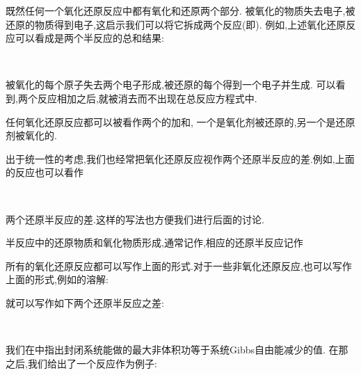 \documentclass{ctexart}
\begin{document}
既然任何一个氧化还原反应中都有氧化和还原两个部分.%
被氧化的物质失去电子,被还原的物质得到电子,这启示我们可以将它拆成两个反应(即).
例如,上述氧化还原反应可以看成是两个半反应的总和结果:
\begin{tightcenter}
    \\
\end{tightcenter}
被氧化的每个原子失去两个电子形成,被还原的每个得到一个电子并生成.%
可以看到,两个反应相加之后,就被消去而不出现在总反应方程式中.
\begin{definition}[6A.1.2 半反应]
    任何氧化还原反应都可以被看作两个的加和,%
    一个是氧化剂被还原的,另一个是还原剂被氧化的.
\end{definition}
出于统一性的考虑,我们也经常把氧化还原反应视作两个还原半反应的差.例如,上面的反应也可以看作
\begin{tightcenter}
    \\
\end{tightcenter}
两个还原半反应的差.这样的写法也方便我们进行后面的讨论.
\begin{definition}[6A.1.3 氧化还原对]
    半反应中的还原物质和氧化物质\footnotemark 形成,通常记作,相应的还原半反应记作
    \begin{tightcenter}
    \end{tightcenter}

\end{definition}
所有的氧化还原反应都可以写作上面的形式.对于一些非氧化还原反应,也可以写作上面的形式,例如的溶解:
\begin{tightcenter}
\end{tightcenter}
就可以写作如下两个还原半反应之差:
\begin{tightcenter}
    \\
\end{tightcenter}
\vspace{8pt}
\indent 我们在中指出封闭系统能做的最大非体积功等于系统Gibbs自由能减少的值.%
在那之后,我们给出了一个反应作为例子:
\begin{tightcenter}
\end{tightcenter}
\end{document}
